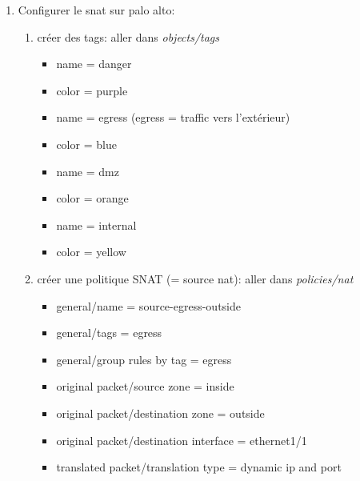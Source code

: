 \documentclass[a4paper]{article}
\begin{document}
\begin{enumerate}
\item Configurer le snat sur palo alto:
\begin{enumerate}
    \item créer des tags: aller dans \textit{objects/tags}
    \begin{example} \begin{itemize}
        \item name = danger
        \item color = purple
    \end{itemize} \end{example}
    \begin{example} \begin{itemize}
        \item name = egress (egress = traffic vers l'extérieur)
        \item color = blue
    \end{itemize} \end{example}
    \begin{example} \begin{itemize}
        \item name = dmz
        \item color = orange
    \end{itemize} \end{example}
    \begin{example} \begin{itemize}
        \item name = internal
        \item color = yellow
    \end{itemize} \end{example}
    \item créer une politique SNAT (= source nat): aller dans \textit{policies/nat}
    \begin{example} \begin{itemize}
        \item general/name = source-egress-outside
        \item general/tags = egress
        \item general/group rules by tag = egress
        \item original packet/source zone = inside
        \item original packet/destination zone = outside
        \item original packet/destination interface = ethernet1/1
        \item translated packet/translation type = dynamic ip and port

\end{itemize}
\end{example}
\end{enumerate}
\end{enumerate}
\end{document}
